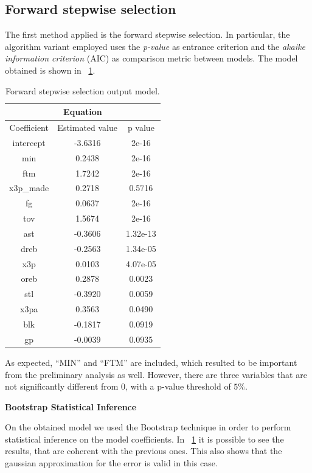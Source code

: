 \subsection{Forward stepwise selection}

The first method applied is the forward stepwise selection. In particular, the algorithm variant employed uses the \textit{p-value} as entrance criterion and the \textit{akaike information criterion} (AIC) as comparison metric between models. The model obtained is shown in \Fig~\ref{table:ForwardModelSummary}.

\begin{table}[h]
	\centering
	\begin{tabular}{||c | c | c ||} 
		\hline
		\multicolumn{3}{|c|}{Equation} \\
		\hline
		Coefficient & Estimated value & p value \\
		\hline
		intercept & -3.6316 & 2e-16 \\
		min & 0.2438 & 2e-16 \\
		ftm & 1.7242 & 2e-16 \\
		x3p\_made & 0.2718 & 0.5716 \\
		fg & 0.0637 & 2e-16 \\
		tov & 1.5674 & 2e-16 \\
		ast & -0.3606 & 1.32e-13 \\
		dreb & -0.2563 & 1.34e-05 \\
		x3p & 0.0103 & 4.07e-05 \\
		oreb & 0.2878 & 0.0023 \\
		stl & -0.3920 & 0.0059 \\
		x3pa & 0.3563 & 0.0490 \\
		blk & -0.1817 & 0.0919 \\
		gp & -0.0039 & 0.0935 \\
		\hline
	\end{tabular}
	\caption{Forward stepwise selection output model.}
	\label{table:ForwardModelSummary}
\end{table}

As expected, ``MIN'' and ``FTM'' are included, which resulted to be important from the preliminary analysis as well. However, there are three variables that are not significantly different from 0, with a p-value threshold of $5\%$.

\textbf{Bootstrap Statistical Inference}

On the obtained model we used the Bootstrap technique in order to perform statistical inference on the model coefficients. In \Fig~\ref{table:ForwardModelSummary} it is possible to see the results, that are coherent with the previous ones. This also shows that the gaussian approximation for the error is valid in this case. 

